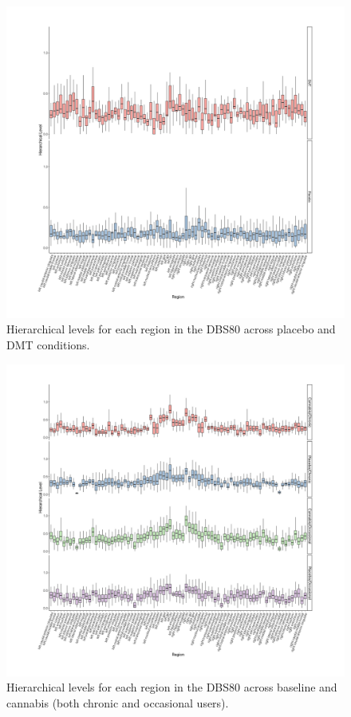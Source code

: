\begin{figure}
    \centering
    \includegraphics[width=\textwidth]{images/Appendix_ DMT HL.png}
    \caption{Hierarchical levels for each region in the DBS80 across placebo and DMT conditions.}
    \label{fig:dmthl}
\end{figure}

\begin{figure}
    \centering
    \includegraphics[width=\textwidth]{images/Appendix_ Cannab HL.png}
    \caption{Hierarchical levels for each region in the DBS80 across baseline and cannabis (both chronic and occasional users).}
    \label{fig:cannabishl}
\end{figure}